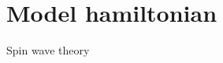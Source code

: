 \chapter{\label{method}Model hamiltonian}
Spin wave theory
\setcounter{equation}{0}
\setcounter{table}{0}
\setcounter{figure}{0}


    



